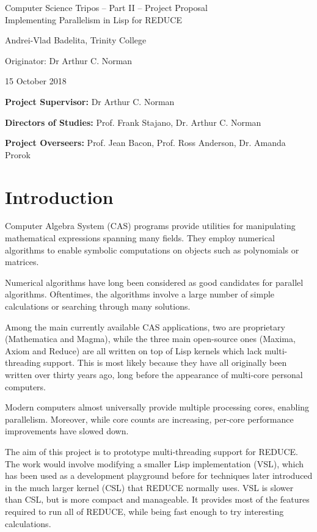 \documentclass[12pt,a4paper,twoside]{article}
\begin{document}
	
	\begin{center}
		\Large
		Computer Science Tripos -- Part II -- Project Proposal\\[4mm]
		\LARGE
		Implementing Parallelism in Lisp for REDUCE
		
		\large
		Andrei-Vlad Badelita, Trinity College
		
		Originator: Dr Arthur C. Norman
		
		15 October 2018
	\end{center}
	
	\vspace{5mm}
	
	\textbf{Project Supervisor:} Dr Arthur C. Norman
	
	\textbf{Directors of Studies:} Prof. Frank Stajano, Dr. Arthur C. Norman 
	
	\textbf{Project Overseers:} Prof. Jean Bacon, Prof. Ross Anderson, Dr. Amanda Prorok
	
	
	\section*{Introduction}
	
	Computer Algebra System (CAS) programs provide utilities for manipulating mathematical expressions 
	spanning many fields. They employ  numerical algorithms to enable symbolic computations
	on objects such as polynomials or matrices.
	
	Numerical algorithms have long been considered as good candidates for parallel algorithms.
	Oftentimes, the algorithms involve a large number of simple calculations or searching through
	many solutions.
	
	Among the main currently available CAS applications, two are proprietary (Mathematica and Magma),
	while the three main open-source ones (Maxima, Axiom and Reduce) are all written on top of Lisp
	kernels which lack multi-threading support. This is most likely because they have all originally been
	written over thirty years ago, long before the appearance of multi-core personal computers.
	
	Modern computers almost universally provide multiple processing cores, enabling parallelism.
	Moreover, while core counts are increasing, per-core performance improvements have slowed down.
	
	The aim of this project is to prototype multi-threading support for REDUCE. The work would involve
	modifying a smaller Lisp implementation (VSL), which has been used as a development playground
	before for techniques later introduced in the much larger kernel (CSL) that REDUCE normally uses.
	VSL is slower than CSL, but is more compact and manageable. It provides 
	most of the features required to run all of REDUCE, while being fast enough to try
	interesting calculations.
	
\end{document}
